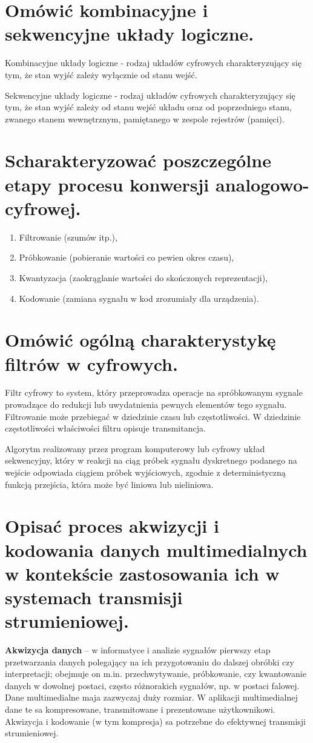 \documentclass[12pt,a4paper]{article}
\begin{document}
	\section{Omówić kombinacyjne i sekwencyjne układy logiczne.}
	Kombinacyjne układy logiczne - rodzaj układów cyfrowych charakteryzujący się tym, że stan wyjść zależy wyłącznie od stanu wejść.

	Sekwencyjne układy logiczne - rodzaj układów cyfrowych charakteryzujący się tym, że stan wyjść zależy od stanu wejść układu oraz od poprzedniego stanu, zwanego stanem wewnętrznym, pamiętanego w zespole rejestrów (pamięci).

	\section{Scharakteryzować poszczególne etapy procesu konwersji analogowo-cyfrowej.}
	\begin{enumerate}
		\item Filtrowanie (szumów itp.),
		\item Próbkowanie (pobieranie wartości co pewien okres czasu),
		\item Kwantyzacja (zaokrąglanie wartości do skończonych reprezentacji),
		\item Kodowanie (zamiana sygnału w kod zrozumiały dla urządzenia).
	\end{enumerate}

	\section{Omówić ogólną charakterystykę filtrów w cyfrowych.}
	Filtr cyfrowy to system, który przeprowadza operacje na spróbkowanym sygnale prowadzące do redukcji lub uwydatnienia pewnych elementów tego sygnału. Filtrowanie może przebiegać w dziedzinie czasu lub częstotliwości. W dziedzinie częstotliwości właściwości filtru opisuje transmitancja.

	Algorytm realizowany przez program komputerowy lub cyfrowy układ sekwencyjny, który w reakcji na ciąg próbek sygnału dyskretnego podanego na wejście odpowiada ciągiem próbek wyjściowych, zgodnie z deterministyczną funkcją przejścia, która może być liniowa lub nieliniowa.

	\section{Opisać proces akwizycji i kodowania danych multimedialnych w kontekście zastosowania ich w systemach transmisji strumieniowej.}
	\textbf{Akwizycja danych} – w informatyce i analizie sygnałów pierwszy etap przetwarzania danych polegający na ich przygotowaniu do dalszej obróbki czy interpretacji; obejmuje on m.in. przechwytywanie, próbkowanie, czy kwantowanie danych w dowolnej postaci, często różnorakich sygnałów, np. w postaci falowej.\\
	Dane multimedialne maja zazwyczaj duży rozmiar. W aplikacji multimedialnej dane te sa kompresowane, transmitowane i prezentowane użytkownikowi. Akwizycja i kodowanie (w tym kompresja) sa potrzebne do efektywnej transmisji strumieniowej.
\end{document}

